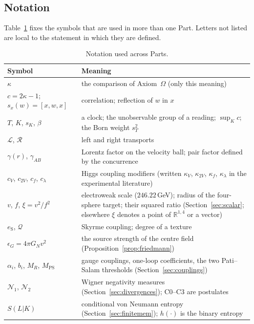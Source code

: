 \documentclass[aps,pra,onecolumn,superscriptaddress,nofootinbib,10pt]{revtex4-2}
\theoremstyle{definition}
\theoremstyle{remark}
\newcommand{\R}{\mathbb{R}}
\newcommand{\cL}{\mathcal{L}}
\newcommand{\cR}{\mathcal{R}}
\newcommand{\hp}[3]{[#1,#2,#3]}
\begin{document}
\subsection{Notation}\label{sec:notation}
Table~\ref{tab:notation} fixes the symbols that are used in more than one Part.  Letters not listed are local to
the statement in which they are defined.
\begin{table}[h]
\caption{Notation used across Parts.}\label{tab:notation}
\footnotesize
\begin{tabular}{@{}p{}p{}@{}}
\toprule
Symbol & Meaning\\
\midrule
$\kappa$ & the comparison of Axiom~$\Omega$ (only this meaning)\\
$c=2\kappa-1$; $s_x(w)=\hp{x}{w}{x}$ & correlation; reflection of $w$ in $x$\\
$T$, $K$, $s_K$, $\beta$ & a clock; the unobservable group of a reading; $\sup_Kc$; the Born weight $s_T^2$\\
$\cL$, $\cR$ & left and right transports\\
$\gamma(r)$, $\gamma_{AB}$ & Lorentz factor on the velocity ball; pair factor defined by the concurrence\\
$c_V$, $c_{2V}$, $c_f$, $c_\lambda$ & Higgs coupling modifiers (written $\kappa_V$, $\kappa_{2V}$, $\kappa_f$, $\kappa_\lambda$ in the experimental literature)\\
$v$, $f$, $\xi=v^2/f^2$ & electroweak scale ($246.22$\,GeV); radius of the four-sphere target; their squared ratio (Section~\ref{sec:scalar}; elsewhere $\xi$ denotes a point of $\R^{1,4}$ or a vector)\\
$e_{\mathrm S}$, $\mathcal Q$ & Skyrme coupling; degree of a texture\\
$\epsilon_G=4\pi G_Nv^2$ & the source strength of the centre field (Proposition~\ref{prop:friedmann})\\
$\alpha_i$, $b_i$, $M_R$, $M_{\mathrm{PS}}$ & gauge couplings, one-loop coefficients, the two Pati--Salam thresholds (Section~\ref{sec:couplings})\\
$\mathcal N_1$, $\mathcal N_2$ & Wigner negativity measures (Section~\ref{sec:divergences}); C0--C3 are postulates\\
$S(L|K)$ & conditional von Neumann entropy (Section~\ref{sec:finitemem}); $h(\cdot)$ is the binary entropy\\
\bottomrule
\end{tabular}
\end{table}
\end{document}
